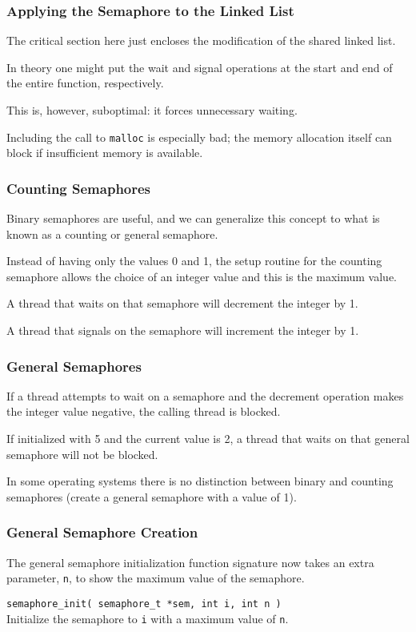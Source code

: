 \begin{frame}
\frametitle{Applying the Semaphore to the Linked List}

The critical section here just encloses the modification of the shared linked list. 

In theory one might put the wait and signal operations at the start and end of the entire function, respectively. 

This is, however, suboptimal: it forces unnecessary waiting. 

Including the call to \texttt{malloc} is especially bad; the memory allocation itself can block if insufficient memory is available. 

\end{frame}

\begin{frame}
\frametitle{Counting Semaphores}

Binary semaphores are useful, and we can generalize this concept to what is known as a \alert{counting} or \alert{general} semaphore. 

Instead of having only the values 0 and 1, the setup routine for the counting semaphore allows the choice of an integer value and this is the maximum value. 

A thread that waits on that semaphore will decrement the integer by 1.

A thread that signals on the semaphore will increment the integer by 1. 

\end{frame}


\begin{frame}
\frametitle{General Semaphores}

If a thread attempts to wait on a semaphore and the decrement operation makes the integer value negative, the calling thread is blocked. 

If initialized with 5 and the current value is 2, a thread that waits on that general semaphore will not be blocked.

In some operating systems there is no distinction between binary and counting semaphores (create a general semaphore with a value of 1).

\end{frame}


\begin{frame}
\frametitle{General Semaphore Creation}

The general semaphore initialization function signature now takes an extra parameter, \texttt{n}, to show the maximum value of the semaphore.

\texttt{semaphore\_init( semaphore\_t *sem, int i, int n )}\\
Initialize the semaphore to \texttt{i} with a maximum value of \texttt{n}.


\end{frame}




